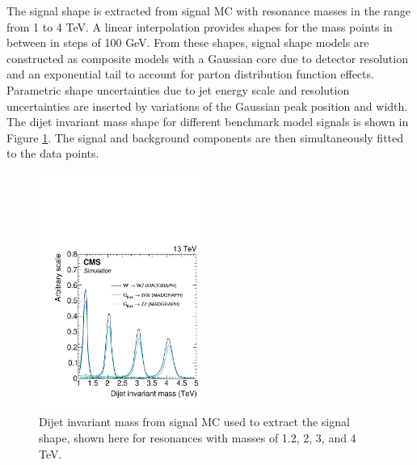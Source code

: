 The signal shape is extracted from signal MC with resonance masses in the range from 1 to 4 TeV. A linear interpolation provides shapes for the mass points in between in steps of 100 GeV. From these shapes, signal shape models are constructed as composite models with a Gaussian core due to detector resolution and an exponential tail to account for parton distribution function effects. Parametric shape uncertainties due to jet energy scale and resolution uncertainties are inserted by variations of the Gaussian peak position and width. The dijet invariant mass shape for different benchmark model signals is shown in Figure \ref{fig:searchI:sigfit}. The signal and background components are then simultaneously fitted to the data points.
\begin{figure}[h!]
\centering
\includegraphics[width=0.49\textwidth]{figures/analysis/search1/B2G-16-004/Figure_005-a.pdf}
\caption{Dijet invariant mass from signal MC used to extract the signal shape, shown here for resonances with masses of 1.2, 2, 3, and 4 TeV.}
\label{fig:searchI:sigfit}
\end{figure}
\clearpage

